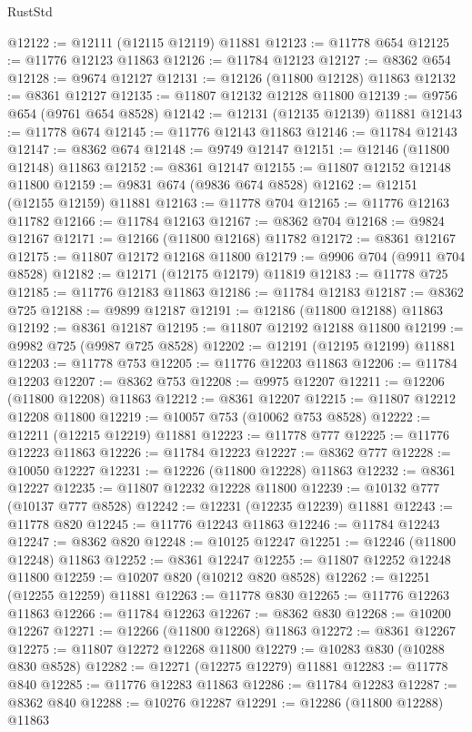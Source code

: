 \begin{lexlean}{RustStd}
\begin{coremodule}
@12122 := @12111 (@12115 @12119) @11881
@12123 := @11778 @654
@12125 := @11776 @12123 @11863
@12126 := @11784 @12123
@12127 := @8362 @654
@12128 := @9674 @12127
@12131 := @12126 (@11800 @12128) @11863
@12132 := @8361 @12127
@12135 := @11807 @12132 @12128 @11800
@12139 := @9756 @654 (@9761 @654 @8528)
@12142 := @12131 (@12135 @12139) @11881
@12143 := @11778 @674
@12145 := @11776 @12143 @11863
@12146 := @11784 @12143
@12147 := @8362 @674
@12148 := @9749 @12147
@12151 := @12146 (@11800 @12148) @11863
@12152 := @8361 @12147
@12155 := @11807 @12152 @12148 @11800
@12159 := @9831 @674 (@9836 @674 @8528)
@12162 := @12151 (@12155 @12159) @11881
@12163 := @11778 @704
@12165 := @11776 @12163 @11782
@12166 := @11784 @12163
@12167 := @8362 @704
@12168 := @9824 @12167
@12171 := @12166 (@11800 @12168) @11782
@12172 := @8361 @12167
@12175 := @11807 @12172 @12168 @11800
@12179 := @9906 @704 (@9911 @704 @8528)
@12182 := @12171 (@12175 @12179) @11819
@12183 := @11778 @725
@12185 := @11776 @12183 @11863
@12186 := @11784 @12183
@12187 := @8362 @725
@12188 := @9899 @12187
@12191 := @12186 (@11800 @12188) @11863
@12192 := @8361 @12187
@12195 := @11807 @12192 @12188 @11800
@12199 := @9982 @725 (@9987 @725 @8528)
@12202 := @12191 (@12195 @12199) @11881
@12203 := @11778 @753
@12205 := @11776 @12203 @11863
@12206 := @11784 @12203
@12207 := @8362 @753
@12208 := @9975 @12207
@12211 := @12206 (@11800 @12208) @11863
@12212 := @8361 @12207
@12215 := @11807 @12212 @12208 @11800
@12219 := @10057 @753 (@10062 @753 @8528)
@12222 := @12211 (@12215 @12219) @11881
@12223 := @11778 @777
@12225 := @11776 @12223 @11863
@12226 := @11784 @12223
@12227 := @8362 @777
@12228 := @10050 @12227
@12231 := @12226 (@11800 @12228) @11863
@12232 := @8361 @12227
@12235 := @11807 @12232 @12228 @11800
@12239 := @10132 @777 (@10137 @777 @8528)
@12242 := @12231 (@12235 @12239) @11881
@12243 := @11778 @820
@12245 := @11776 @12243 @11863
@12246 := @11784 @12243
@12247 := @8362 @820
@12248 := @10125 @12247
@12251 := @12246 (@11800 @12248) @11863
@12252 := @8361 @12247
@12255 := @11807 @12252 @12248 @11800
@12259 := @10207 @820 (@10212 @820 @8528)
@12262 := @12251 (@12255 @12259) @11881
@12263 := @11778 @830
@12265 := @11776 @12263 @11863
@12266 := @11784 @12263
@12267 := @8362 @830
@12268 := @10200 @12267
@12271 := @12266 (@11800 @12268) @11863
@12272 := @8361 @12267
@12275 := @11807 @12272 @12268 @11800
@12279 := @10283 @830 (@10288 @830 @8528)
@12282 := @12271 (@12275 @12279) @11881
@12283 := @11778 @840
@12285 := @11776 @12283 @11863
@12286 := @11784 @12283
@12287 := @8362 @840
@12288 := @10276 @12287
@12291 := @12286 (@11800 @12288) @11863

\end{coremodule}
\end{lexlean}
